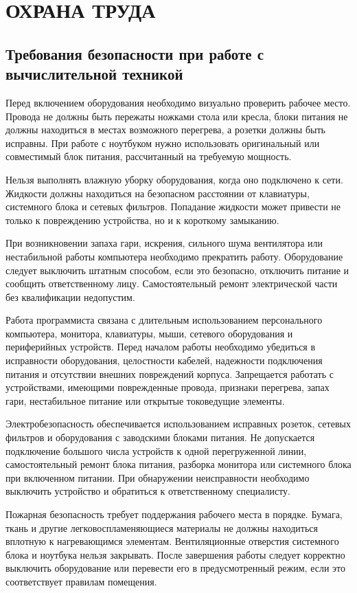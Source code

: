\chapter{ОХРАНА ТРУДА}

\section{Требования безопасности при работе с вычислительной техникой}

Перед включением оборудования необходимо визуально проверить рабочее место. Провода не должны быть пережаты ножками стола или кресла, блоки питания не должны находиться в местах возможного перегрева, а розетки должны быть исправны. При работе с ноутбуком нужно использовать оригинальный или совместимый блок питания, рассчитанный на требуемую мощность.


Нельзя выполнять влажную уборку оборудования, когда оно подключено к сети. Жидкости должны находиться на безопасном расстоянии от клавиатуры, системного блока и сетевых фильтров. Попадание жидкости может привести не только к повреждению устройства, но и к короткому замыканию.


При возникновении запаха гари, искрения, сильного шума вентилятора или нестабильной работы компьютера необходимо прекратить работу. Оборудование следует выключить штатным способом, если это безопасно, отключить питание и сообщить ответственному лицу. Самостоятельный ремонт электрической части без квалификации недопустим.


Работа программиста связана с длительным использованием персонального компьютера, монитора, клавиатуры, мыши, сетевого оборудования и периферийных устройств. Перед началом работы необходимо убедиться в исправности оборудования, целостности кабелей, надежности подключения питания и отсутствии внешних повреждений корпуса. Запрещается работать с устройствами, имеющими поврежденные провода, признаки перегрева, запах гари, нестабильное питание или открытые токоведущие элементы.


Электробезопасность обеспечивается использованием исправных розеток, сетевых фильтров и оборудования с заводскими блоками питания. Не допускается подключение большого числа устройств к одной перегруженной линии, самостоятельный ремонт блока питания, разборка монитора или системного блока при включенном питании. При обнаружении неисправности необходимо выключить устройство и обратиться к ответственному специалисту.


Пожарная безопасность требует поддержания рабочего места в порядке. Бумага, ткань и другие легковоспламеняющиеся материалы не должны находиться вплотную к нагревающимся элементам. Вентиляционные отверстия системного блока и ноутбука нельзя закрывать. После завершения работы следует корректно выключить оборудование или перевести его в предусмотренный режим, если это соответствует правилам помещения.


